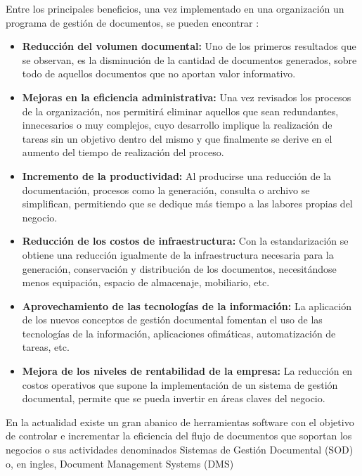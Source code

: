 Entre los principales beneficios, una vez implementado en una organización un programa de gestión de documentos, se pueden encontrar \cite{zapata}:
\begin{itemize}
\item \textbf{Reducción del volumen documental:} Uno de los primeros resultados que se observan, es la disminución de la cantidad de documentos generados, sobre todo de aquellos documentos que no aportan valor informativo. 
\item \textbf{Mejoras en la eficiencia administrativa:} Una vez revisados los procesos de la organización, nos permitirá eliminar aquellos que sean redundantes, innecesarios o muy complejos, cuyo desarrollo implique la realización de tareas sin un objetivo dentro del mismo y que finalmente se derive en el aumento del tiempo de realización del proceso. 
\item \textbf{Incremento de la productividad:} %
Al producirse una reducción de la documentación, procesos como la  generación, consulta o archivo se simplifican, permitiendo que se dedique más tiempo a las labores propias del negocio.
\item \textbf{Reducción de los costos de infraestructura:} Con la estandarización se obtiene una reducción igualmente de  la infraestructura necesaria para la generación,  conservación y distribución de los documentos,  necesitándose menos equipación, espacio de almacenaje, mobiliario, etc. 
\item \textbf{Aprovechamiento de las tecnologías de la información:} La aplicación de los nuevos conceptos de gestión documental fomentan el uso de las tecnologías de la información, aplicaciones ofimáticas, automatización de tareas, etc. 
\item \textbf{Mejora de los niveles de rentabilidad de la empresa:} La reducción en costos operativos que supone la implementación de un sistema de gestión documental, permite que se pueda invertir en áreas claves del negocio.
\end{itemize}
\bigskip
En la actualidad existe un gran abanico de herramientas software con el objetivo de controlar e incrementar la eficiencia del flujo de documentos que soportan los negocios o sus actividades denominados Sistemas de Gestión Documental (SOD) o, en ingles, Document Management Systems (DMS)

